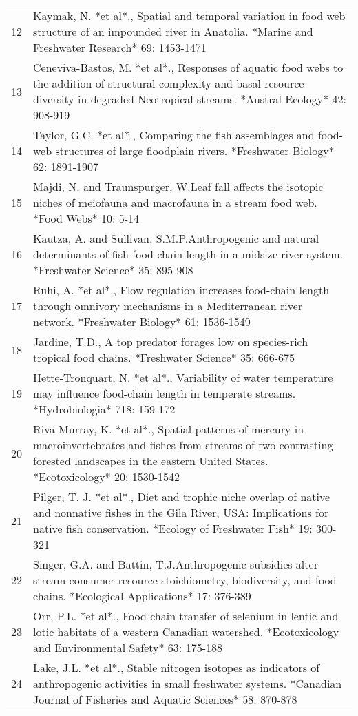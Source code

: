 \begin{table}[ht]
\begin{tabularx}{\textwidth}{rl}
   12 & Kaymak, N. *et al*., Spatial and temporal variation in food web structure of an impounded river in Anatolia. *Marine and Freshwater Research* 69: 1453-1471 \\ 
   13 & Ceneviva-Bastos, M. *et al*., Responses of aquatic food webs to the addition of structural complexity and basal resource diversity in degraded Neotropical streams. *Austral Ecology* 42: 908-919 \\ 
   14 & Taylor, G.C. *et al*., Comparing the fish assemblages and food-web structures of large floodplain rivers. *Freshwater Biology* 62: 1891-1907 \\ 
   15 & Majdi, N. and Traunspurger, W.Leaf fall affects the isotopic niches of meiofauna and macrofauna in a stream food web. *Food Webs* 10: 5-14 \\ 
   16 & Kautza, A. and Sullivan, S.M.P.Anthropogenic and natural determinants of fish food-chain length in a midsize river system. *Freshwater Science* 35: 895-908 \\ 
   17 & Ruhi, A. *et al*., Flow regulation increases food-chain length through omnivory mechanisms in a Mediterranean river network. *Freshwater Biology* 61: 1536-1549 \\ 
   18 & Jardine, T.D., A top predator forages low on species-rich tropical food chains. *Freshwater Science* 35: 666-675 \\ 
   19 & Hette-Tronquart, N. *et al*., Variability of water temperature may influence food-chain length in temperate streams. *Hydrobiologia* 718: 159-172 \\ 
   20 & Riva-Murray, K. *et al*., Spatial patterns of mercury in macroinvertebrates and fishes from streams of two contrasting forested landscapes in the eastern United States. *Ecotoxicology* 20: 1530-1542 \\ 
   21 & Pilger, T. J. *et al*., Diet and trophic niche overlap of native and nonnative fishes in the Gila River, USA: Implications for native fish conservation. *Ecology of Freshwater Fish* 19: 300-321 \\ 
   22 & Singer, G.A. and Battin, T.J.Anthropogenic subsidies alter stream consumer-resource stoichiometry, biodiversity, and food chains. *Ecological Applications* 17: 376-389 \\ 
   23 & Orr, P.L. *et al*., Food chain transfer of selenium in lentic and lotic habitats of a western Canadian watershed. *Ecotoxicology and Environmental Safety* 63: 175-188 \\ 
   24 & Lake, J.L. *et al*., Stable nitrogen isotopes as indicators of anthropogenic activities in small freshwater systems. *Canadian Journal of Fisheries and Aquatic Sciences* 58: 870-878 \\ 

\end{tabularx}
\end{table}
